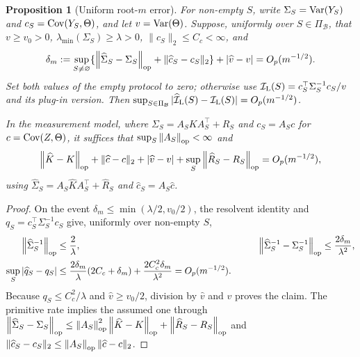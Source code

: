 \theoremstyle{plain}
\newtheorem*{bestlinearproposition}{Proposition}
\begin{bestlinearproposition}[Uniform root-$m$ error]
For non-empty $S$, write $\Sigma_S=\operatorname{Var}(Y_S)$ and
$c_S=\operatorname{Cov}(Y_S,\Theta)$, and let $v=\operatorname{Var}(\Theta)$. Suppose, uniformly over
$S\in\Pi_{\mathcal B}$, that $v\ge v_0>0$,
$\lambda_{\min}(\Sigma_S)\ge\lambda>0$, $\|c_S\|_2\le C_c<\infty$, and
\begin{equation*}
\delta_m:=\sup_{S\ne\varnothing}
\{\left\lVert \widehat\Sigma_S-\Sigma_S \right\rVert_{\mathrm{op}}+\|\widehat c_S-c_S\|_2\}
+|\widehat v-v|=O_p(m^{-1/2}).
\end{equation*}
Set both values of the empty protocol to zero; otherwise use
$\mathcal{I}_{\mathrm L}(S)=c_S^\top\Sigma_S^{-1}c_S/v$ and its plug-in version.
Then
$\sup_{S\in\Pi_{\mathcal B}}|\widehat{\mathcal{I}}_{\mathrm L}(S)-\mathcal{I}_{\mathrm L}(S)|
=O_p(m^{-1/2})$.

In the measurement model, where $\Sigma_S=A_SKA_S^\top+R_S$ and
$c_S=A_Sc$ for $c=\operatorname{Cov}(Z,\Theta)$, it suffices that
$\sup_S\left\lVert A_S \right\rVert_{\mathrm{op}}<\infty$ and
\begin{equation*}
\left\lVert \widehat K-K \right\rVert_{\mathrm{op}}+\|\widehat c-c\|_2+|\widehat v-v|
+\sup_S\left\lVert \widehat R_S-R_S \right\rVert_{\mathrm{op}}=O_p(m^{-1/2}),
\end{equation*}
using $\widehat\Sigma_S=A_S\widehat K A_S^\top+\widehat R_S$ and
$\widehat c_S=A_S\widehat c$.
\end{bestlinearproposition}

\begin{proof}
On the event $\delta_m\le\min(\lambda/2,v_0/2)$, the resolvent identity
and $q_S=c_S^\top\Sigma_S^{-1}c_S$ give, uniformly over non-empty $S$,
\begin{equation*}
\begin{aligned}
\left\lVert \widehat\Sigma_S^{-1} \right\rVert_{\mathrm{op}}&\le\frac{2}{\lambda},
&\qquad
\left\lVert \widehat\Sigma_S^{-1}-\Sigma_S^{-1} \right\rVert_{\mathrm{op}}
&\le\frac{2\delta_m}{\lambda^2},\\
\sup_S|\widehat q_S-q_S|&\le
\frac{2\delta_m}{\lambda}(2C_c+\delta_m)
+\frac{2C_c^2\delta_m}{\lambda^2}
=O_p(m^{-1/2}).
\end{aligned}
\end{equation*}
Because $q_S\le C_c^2/\lambda$ and $\widehat v\ge v_0/2$, division by
$\widehat v$ and $v$ proves the claim. The primitive rate implies the assumed
one through
$\left\lVert \widehat\Sigma_S-\Sigma_S \right\rVert_{\mathrm{op}}
\le\left\lVert A_S \right\rVert_{\mathrm{op}}^2\left\lVert \widehat K-K \right\rVert_{\mathrm{op}}
+\left\lVert \widehat R_S-R_S \right\rVert_{\mathrm{op}}$ and
$\|\widehat c_S-c_S\|_2\le\left\lVert A_S \right\rVert_{\mathrm{op}}\|\widehat c-c\|_2$.
\end{proof}
